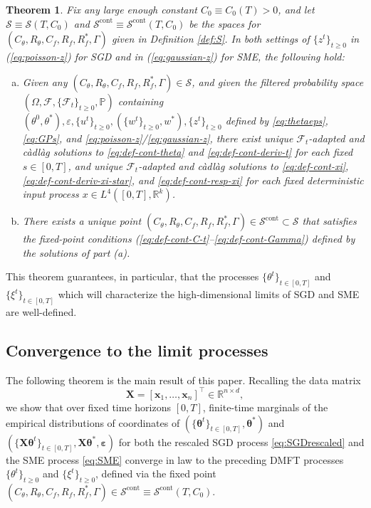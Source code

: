\documentclass[11pt,letterpaper,reqno]{amsart}
\newtheorem{thm}{Theorem}[section]
\theoremstyle{definition}
\def\eps{\varepsilon}
\def\P{\mathbb{P}}
\def\R{\mathbb{R}}
\def\cS{\mathcal{S}}
\def\cF{\mathcal{F}}
\def\x{\mathbf{x}}
\def\X{\mathbf{X}}
\def\beps{\boldsymbol{\varepsilon}}
\def\btheta{\boldsymbol{\theta}}
\begin{document}
\begin{thm}\label{thm:uniqueness-existence}
Fix any large enough constant $C_0 \equiv C_0(T)>0$, and let
$\cS \equiv \cS(T,C_0)$ and
$\cS^\text{cont} \equiv \cS^\text{cont}(T,C_0)$ be the spaces for
$(C_\theta,R_\theta,C_f,R_f,R_f^*,\Gamma)$ given in
Definition \ref{def:S}. In both settings of
$\{z^t\}_{t \geq 0}$ in (\ref{eq:poisson-z}) for SGD and 
in (\ref{eq:gaussian-z}) for SME, the following hold:
\begin{enumerate}[(a)]
\item Given any $(C_\theta,R_\theta,C_f,R_f,R_f^*,\Gamma) \in \cS$, and given
the filtered probability space $(\Omega,\cF,\{\cF_t\}_{t \geq 0},\P)$
containing $(\theta^0,\theta^*),\eps,\{u^t\}_{t \geq 0},(\{w^t\}_{t \geq
0},w^*),\{z^t\}_{t \geq 0}$ defined by \eqref{eq:thetaeps}, \eqref{eq:GPs},
and \eqref{eq:poisson-z}/\eqref{eq:gaussian-z},
there exist unique $\cF_t$-adapted and c\`adl\`ag solutions to
\eqref{eq:def-cont-theta} and \eqref{eq:def-cont-deriv-t} for each fixed $s \in [0,T]$,
and unique $\cF_t$-adapted and c\`adl\`ag solutions to
\eqref{eq:def-cont-xi}, \eqref{eq:def-cont-deriv-xi-star}, and
\eqref{eq:def-cont-resp-xi} for each fixed deterministic input process
$x \in L^4([0,T],\R^k)$.
\item There exists a unique point $(C_\theta,R_\theta,C_f,R_f,R_f^*,\Gamma) \in
\cS^\text{cont} \subset \cS$ that satisfies the fixed-point conditions
(\ref{eq:def-cont-C-t}--\ref{eq:def-cont-Gamma}) defined by the solutions of
part (a).
\end{enumerate}
\end{thm}

This theorem guarantees, in particular, that the processes
$\{\theta^t\}_{t \in [0,T]}$ and $\{\xi^t\}_{t \in [0,T]}$ which
will characterize the high-dimensional limits of SGD and SME are well-defined.

\subsection{Convergence to the limit processes}

The following theorem is the main result of this paper. Recalling the data
matrix
\[\X=[\x_1,\ldots,\x_n]^\top \in \R^{n \times d},\]
we show that over fixed time horizons $[0,T]$, finite-time marginals
of the empirical
distributions of coordinates of $(\{\btheta^t\}_{t \in [0,T]},\btheta^*)$
and $(\{\X\btheta^t\}_{t \in [0,T]},\X\btheta^*,\beps)$ for both the rescaled SGD
process \eqref{eq:SGDrescaled} and the SME process \eqref{eq:SME}
converge in law to the preceding DMFT processes $\{\theta^t\}_{t \geq 0}$ and
$\{\xi^t\}_{t \geq 0}$,
defined via the fixed point $(C_\theta,R_\theta,C_f,R_f,R_f^*,\Gamma) \in
\cS^\text{cont} \equiv \cS^\text{cont}(T,C_0)$.
\end{document}
